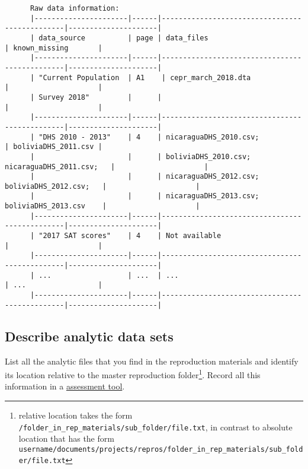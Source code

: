 \documentclass[]{book}
\begin{document}
\begin{verbatim}
      Raw data information:
      |----------------------|------|-----------------------------------------------|---------------------|
      | data_source          | page | data_files                                    | known_missing       |
      |----------------------|------|-----------------------------------------------|---------------------|
      | "Current Population  | A1    | cepr_march_2018.dta                          |                     |
      | Survey 2018"         |      |                                               |                     |
      |----------------------|------|-----------------------------------------------|---------------------|
      | "DHS 2010 - 2013"    | 4    | nicaraguaDHS_2010.csv;                        | boliviaDHS_2011.csv |
      |                      |      | boliviaDHS_2010.csv; nicaraguaDHS_2011.csv;   |                     |
      |                      |      | nicaraguaDHS_2012.csv; boliviaDHS_2012.csv;   |                     |
      |                      |      | nicaraguaDHS_2013.csv; boliviaDHS_2013.csv    |                     |
      |----------------------|------|-----------------------------------------------|---------------------|
      | "2017 SAT scores"    | 4    | Not available                                 |                     |
      |----------------------|------|-----------------------------------------------|---------------------|
      | ...                  | ...  | ...                                           | ...                 |
      |----------------------|------|-----------------------------------------------|---------------------|
\end{verbatim}

\hypertarget{describe-analytic-data-sets}{%
\subsection{Describe analytic data sets}\label{describe-analytic-data-sets}}

List all the analytic files that you find in the reproduction materials and identify its location relative to the master reproduction folder\footnote{relative location takes the form \texttt{/folder\_in\_rep\_materials/sub\_folder/file.txt}, in contrast to absolute location that has the form \texttt{username/documents/projects/repros/folder\_in\_rep\_materials/sub\_folder/file.txt}}. Record all this information in a \href{https://docs.google.com/spreadsheets/d/1LUIdVFH0OfR70C7z07TYeE-uWzKI_JIeWUMaYhqEKK0/edit\#gid=1299317837\&range=A1}{assessment tool}.
\end{document}
